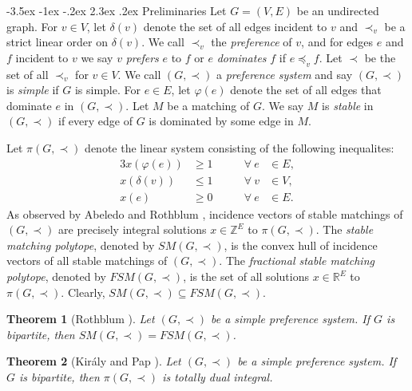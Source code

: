 \documentclass[11pt]{article}
\makeatletter
\newtheorem{theorem}{Theorem}%
\numberwithin{theorem}{section}
\renewcommand\section{%
  \@startsection{section}{1}
                {\z@}%
                {-3.5ex \@plus -1ex \@minus -.2ex}%
                {2.3ex \@plus.2ex}%
                {\large\bfseries}%
}
\makeatother
\begin{document}
\section{Preliminaries}
\label{pre}
Let $G=(V,E)$ be an undirected graph. 
For $v\in V$, let $\delta(v)$ denote the set of all edges incident to $v$ and $\prec_v$ be a strict linear order on $\delta(v)$. 
We call $\prec_v$ the \emph{preference} of $v$, and for edges $e$ and $f$ incident to $v$ we say $v$ \emph{prefers} $e$ to $f$ or $e$ \emph{dominates} $f$ if $e\preceq_v f$. Let $\prec$ be the set of all  $\prec_v$ for $v\in V$.
We call $(G,\prec)$ a \emph{preference system} and say $(G,\prec)$ is \emph{simple} if $G$ is simple.
For $e\in E$, let $\varphi(e)$ denote the set of all edges that dominate $e$ in $(G,\prec)$.
Let $M$ be a matching of $G$. We say $M$ is \emph{stable} in $(G,\prec)$ if every edge of $G$ is dominated by some edge in $M$.

Let $\pi(G,\prec)$ denote the linear system consisting of the following inequalites:
\begin{alignat}{3}
x(\varphi(e)) &\geq 1 &\qquad \forall ~e &\in E,\label{stability constraints}\\
x(\delta(v)) &\leq 1 &\qquad \forall ~v &\in V,\label{matching constraints}\\
x(e) &\geq 0 &\qquad \forall ~e &\in E.\label{edge nonnegativity}
\end{alignat}
As observed by Abeledo and Rothblum \cite{AbelRoth94}, incidence vectors of stable matchings of $(G,\prec)$ are precisely integral solutions $x\in \mathbb{Z}^E$ to $\pi(G,\prec)$.
The \textit{stable matching polytope}, denoted by $SM(G,\prec)$, is the convex hull of incidence vectors of all stable matchings of $(G,\prec)$. The \textit{fractional stable matching polytope}, denoted by $FSM(G,\prec)$, is the set of all solutions $x\in \mathbb{R}^E$ to $\pi(G,\prec)$. Clearly, $SM(G,\prec)\subseteq FSM(G,\prec)$. 

\begin{theorem}[Rothblum \cite{Roth92}]
\label{thm:Roth92}
Let $(G,\prec)$ be a simple preference system. If $G$ is bipartite, then
$SM(G,\prec)=FSM(G,\prec)$.
\end{theorem}

\begin{theorem}[Kir\'{a}ly and Pap \cite{KiraPap08}]
\label{thm:KiraPap08}
Let $(G,\prec)$ be a simple preference system. If $G$ is bipartite, then $\pi(G,\prec)$ is totally dual integral.
\end{theorem}
\end{document}
